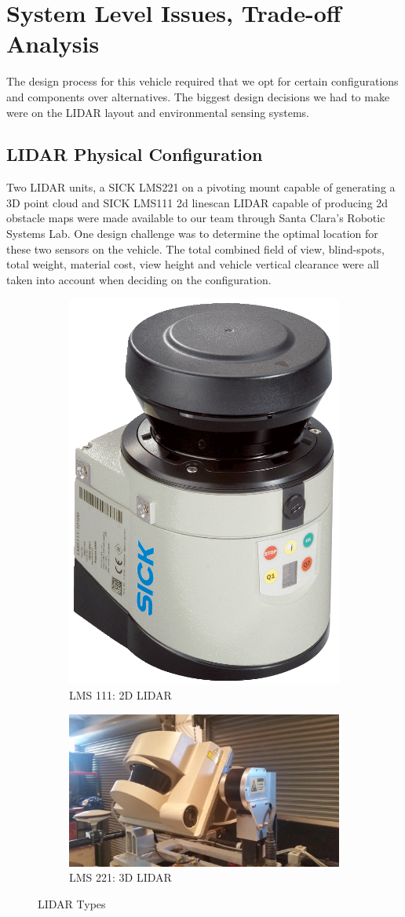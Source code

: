 \section{System Level Issues, Trade-off Analysis}
The design process for this vehicle required that we opt for certain configurations and components over alternatives. The biggest design decisions we had to make were on the LIDAR layout and environmental sensing systems.\\

\subsection{LIDAR Physical Configuration}

Two LIDAR units, a SICK LMS221 on a pivoting mount capable of generating a 3D point cloud and SICK LMS111 2d linescan LIDAR capable of producing 2d obstacle maps were made available to our team through Santa Clara's  Robotic Systems Lab. One design challenge was to determine the optimal location for these two sensors on the vehicle. The total combined field of view, blind-spots, total weight, material cost, view height and vehicle vertical clearance were all taken into account when deciding on the configuration. 

\begin{figure}[H]
\centering
\begin{subfigure}{.5\textwidth}
  \centering
  \includegraphics[height=.5\linewidth]{LMS111}
  \caption{LMS 111: 2D LIDAR}
\end{subfigure}%
\begin{subfigure}{.5\textwidth}
  \centering
  \includegraphics[height=.5\linewidth]{LMS221}
  \caption{LMS 221: 3D LIDAR}
\end{subfigure}
\caption{LIDAR Types}
\label{fig:lidartest}
\end{figure}

